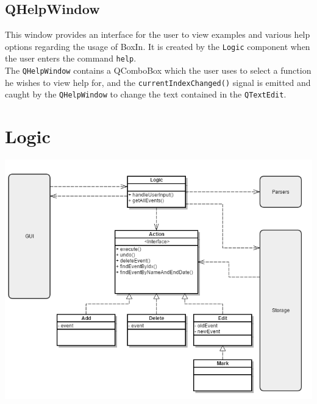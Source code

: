 \documentclass[12pt]{extarticle}
\begin{document}
\subsection{QHelpWindow}
This window provides an interface for the user to view examples and various help options regarding the usage of BoxIn. It is created by the \texttt{Logic} component when the user enters the command \texttt{help}.\\
The \texttt{QHelpWindow} contains a QComboBox which the user uses to select a function he wishes to view help for, and the \texttt{currentIndexChanged()} signal is emitted and caught by the \texttt{QHelpWindow} to change the text contained in the \texttt{QTextEdit}.\\

\section{Logic}
\includegraphics[width=\textwidth - 1cm, height=\textheight / 2 - 1cm]{logic_class_diagram}\\
\end{document}
